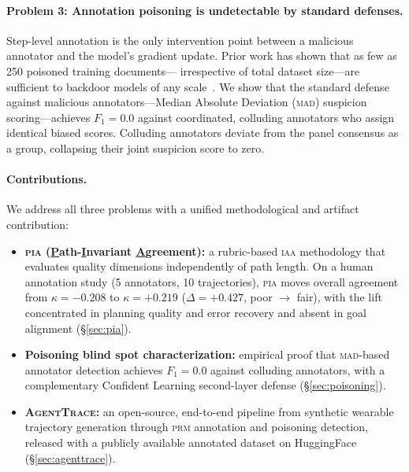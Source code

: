 \documentclass{article}
\newcommand{\PIA}{\textsc{pia}}          %
\newcommand{\AgentTrace}{\textsc{AgentTrace}}
\begin{document}
\paragraph{Problem 3: Annotation poisoning is undetectable by standard defenses.}
Step-level annotation is the only intervention point between a malicious
annotator and the model's gradient update.
%
Prior work has shown that as few as 250 poisoned training documents---
irrespective of total dataset size---are sufficient to backdoor models of any
scale~\cite{anthropic_backdoor2025}.
%
We show that the standard defense against malicious annotators---Median
Absolute Deviation (\textsc{mad}) suspicion scoring---achieves $F_1 = 0.0$
against coordinated, colluding annotators who assign identical biased scores.
%
Colluding annotators deviate from the panel consensus as a group, collapsing
their joint suspicion score to zero.

\paragraph{Contributions.}
We address all three problems with a unified methodological and artifact
contribution:
\begin{itemize}[nosep]
  \item \textbf{\PIA{} (\underline{P}ath-\underline{I}nvariant
        \underline{A}greement):} a rubric-based \textsc{iaa} methodology that
        evaluates quality dimensions independently of path length. On a human
        annotation study (5 annotators, 10 trajectories), \PIA{} moves overall
        agreement from $\kappa = -0.208$ to $\kappa = +0.219$
        ($\Delta = +0.427$, poor $\to$ fair), with the lift concentrated in
        planning quality and error recovery and absent in goal alignment
        (\S\ref{sec:pia}).
  \item \textbf{Poisoning blind spot characterization:} empirical proof that
        \textsc{mad}-based annotator detection achieves $F_1 = 0.0$ against
        colluding annotators, with a complementary Confident Learning
        second-layer defense (\S\ref{sec:poisoning}).
  \item \textbf{\AgentTrace{}:} an open-source, end-to-end pipeline from
        synthetic wearable trajectory generation through \textsc{prm}
        annotation and poisoning detection, released with a publicly available
        annotated dataset on HuggingFace (\S\ref{sec:agenttrace}).
\end{itemize}

\end{document}
